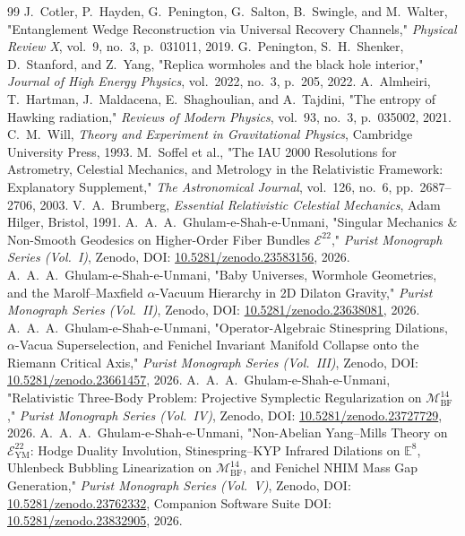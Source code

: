 \documentclass[11pt,a4paper,reqno]{article}
\theoremstyle{plain}
\theoremstyle{definition}
\theoremstyle{remark}
\numberwithin{equation}{section}
\begin{document}
\begin{thebibliography}{99}
 J.~Cotler, P.~Hayden, G.~Penington, G.~Salton, B.~Swingle, and M.~Walter, "Entanglement Wedge Reconstruction via Universal Recovery Channels," \emph{Physical Review X}, vol.~9, no.~3, p.~031011, 2019.
 G.~Penington, S.~H.~Shenker, D.~Stanford, and Z.~Yang, "Replica wormholes and the black hole interior," \emph{Journal of High Energy Physics}, vol.~2022, no.~3, p.~205, 2022.
 A.~Almheiri, T.~Hartman, J.~Maldacena, E.~Shaghoulian, and A.~Tajdini, "The entropy of Hawking radiation," \emph{Reviews of Modern Physics}, vol.~93, no.~3, p.~035002, 2021.
 C.~M.~Will, \emph{Theory and Experiment in Gravitational Physics}, Cambridge University Press, 1993.
 M.~Soffel et al., "The IAU 2000 Resolutions for Astrometry, Celestial Mechanics, and Metrology in the Relativistic Framework: Explanatory Supplement," \emph{The Astronomical Journal}, vol.~126, no.~6, pp.~2687--2706, 2003.
 V.~A.~Brumberg, \emph{Essential Relativistic Celestial Mechanics}, Adam Hilger, Bristol, 1991.
 A.~A.~A.~Ghulam-e-Shah-e-Unmani, "Singular Mechanics \& Non-Smooth Geodesics on Higher-Order Fiber Bundles $\mathcal{E}^{22}$," \emph{Purist Monograph Series (Vol.~I)}, Zenodo, DOI: \href{https://doi.org/10.5281/zenodo.23583156}{10.5281/zenodo.23583156}, 2026.
 A.~A.~A.~Ghulam-e-Shah-e-Unmani, "Baby Universes, Wormhole Geometries, and the Marolf--Maxfield $\alpha$-Vacuum Hierarchy in 2D Dilaton Gravity," \emph{Purist Monograph Series (Vol.~II)}, Zenodo, DOI: \href{https://doi.org/10.5281/zenodo.23638081}{10.5281/zenodo.23638081}, 2026.
 A.~A.~A.~Ghulam-e-Shah-e-Unmani, "Operator-Algebraic Stinespring Dilations, $\alpha$-Vacua Superselection, and Fenichel Invariant Manifold Collapse onto the Riemann Critical Axis," \emph{Purist Monograph Series (Vol.~III)}, Zenodo, DOI: \href{https://doi.org/10.5281/zenodo.23661457}{10.5281/zenodo.23661457}, 2026.
 A.~A.~A.~Ghulam-e-Shah-e-Unmani, "Relativistic Three-Body Problem: Projective Symplectic Regularization on $\mathcal{M}_{\mathrm{BF}}^{14}$," \emph{Purist Monograph Series (Vol.~IV)}, Zenodo, DOI: \href{https://doi.org/10.5281/zenodo.23727729}{10.5281/zenodo.23727729}, 2026.
 A.~A.~A.~Ghulam-e-Shah-e-Unmani, "Non-Abelian Yang--Mills Theory on $\mathcal{E}_{\mathrm{YM}}^{22}$: Hodge Duality Involution, Stinespring--KYP Infrared Dilations on $\mathbb{E}^8$, Uhlenbeck Bubbling Linearization on $\mathcal{M}_{\mathrm{BF}}^{14}$, and Fenichel NHIM Mass Gap Generation," \emph{Purist Monograph Series (Vol.~V)}, Zenodo, DOI: \href{https://doi.org/10.5281/zenodo.23762332}{10.5281/zenodo.23762332}, Companion Software Suite DOI: \href{https://doi.org/10.5281/zenodo.23832905}{10.5281/zenodo.23832905}, 2026.

\end{thebibliography}
\end{document}
